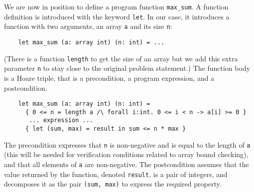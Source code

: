We are now in position to define a program function
\verb|max_sum|. A function definition is introduced with the keyword
\texttt{let}. In our case, it introduces a function with two arguments,
an array \texttt{a} and its size \texttt{n}:
\begin{verbatim}
    let max_sum (a: array int) (n: int) = ...
\end{verbatim}
(There is a function \texttt{length} to get the size of an array but
we add this extra parameter \texttt{n} to stay close to the original
problem statement.) The function body is a Hoare triple, that is a
precondition, a program expression, and a postcondition.
\begin{verbatim}
    let max_sum (a: array int) (n: int) =
      { 0 <= n = length a /\ forall i:int. 0 <= i < n -> a[i] >= 0 }
       ... expression ...
      { let (sum, max) = result in sum <= n * max }
\end{verbatim}
The precondition expresses that \texttt{n} is non-negative and is
equal to the length of \texttt{a} (this will be needed for
verification conditions related to array bound checking), and that all
elements of \texttt{a} are non-negative.
The postcondition assumes that the value returned by the function,
denoted \texttt{result}, is a pair of integers, and decomposes it as
the pair \texttt{(sum, max)} to express the required property.

